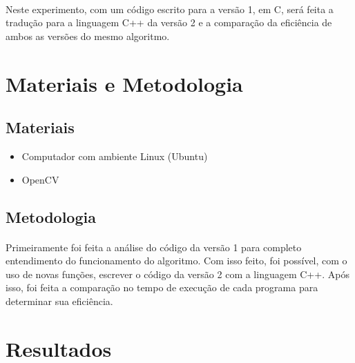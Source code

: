 \documentclass{article}
\begin{document}
	\paragraph{}
	Neste experimento, com um código escrito para a versão 1, em C, será feita a tradução para a linguagem C++ da versão 2 e a comparação da eficiência de ambos as versões do mesmo algoritmo.

	\section{Materiais e Metodologia}
	\subsection{Materiais}
	\begin{itemize}
	\item Computador com ambiente Linux (Ubuntu)
	\item OpenCV
	\end{itemize}

	\subsection{Metodologia}
	\paragraph{}
	Primeiramente foi feita a análise do código da versão 1 para completo entendimento do funcionamento do algoritmo. Com isso feito, foi possível, com o uso de novas funções, escrever o código da versão 2 com a linguagem C++. Após isso, foi feita a comparação no tempo de execução de cada programa para determinar sua eficiência.

	\section{Resultados} %
	\label{sec:resultados}
\end{document}
